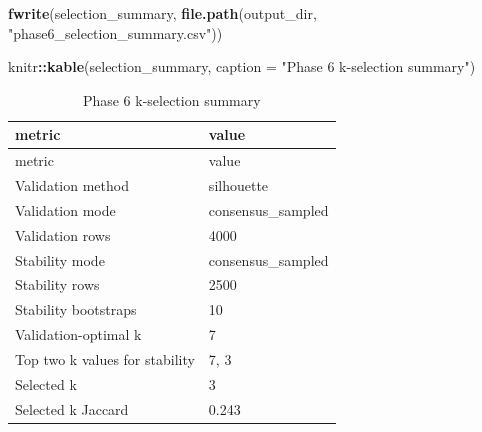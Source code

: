 \documentclass[
]{article}
\newenvironment{Shaded}{\begin{snugshade}}{\end{snugshade}}
\newcommand{\AttributeTok}[1]{\textcolor[rgb]{0.13,0.29,0.53}{#1}}
\newcommand{\FunctionTok}[1]{\textcolor[rgb]{0.13,0.29,0.53}{\textbf{#1}}}
\newcommand{\NormalTok}[1]{#1}
\newcommand{\SpecialCharTok}[1]{\textcolor[rgb]{0.81,0.36,0.00}{\textbf{#1}}}
\newcommand{\StringTok}[1]{\textcolor[rgb]{0.31,0.60,0.02}{#1}}
\begin{document}
\begin{Shaded}
\begin{Highlighting}[]
\FunctionTok{fwrite}\NormalTok{(selection\_summary, }\FunctionTok{file.path}\NormalTok{(output\_dir, }\StringTok{"phase6\_selection\_summary.csv"}\NormalTok{))}

\NormalTok{knitr}\SpecialCharTok{::}\FunctionTok{kable}\NormalTok{(selection\_summary, }\AttributeTok{caption =} \StringTok{"Phase 6 k{-}selection summary"}\NormalTok{)}
\end{Highlighting}
\end{Shaded}

\begin{longtable}[]{@{}ll@{}}
\caption{Phase 6 k-selection summary}\tabularnewline
\toprule\noalign{}
metric & value \\
\midrule\noalign{}
\endfirsthead
\toprule\noalign{}
metric & value \\
\midrule\noalign{}
\endhead
\bottomrule\noalign{}
\endlastfoot
Validation method & silhouette \\
Validation mode & consensus\_sampled \\
Validation rows & 4000 \\
Stability mode & consensus\_sampled \\
Stability rows & 2500 \\
Stability bootstraps & 10 \\
Validation-optimal k & 7 \\
Top two k values for stability & 7, 3 \\
Selected k & 3 \\
Selected k Jaccard & 0.243 \\
\end{longtable}
\end{document}
